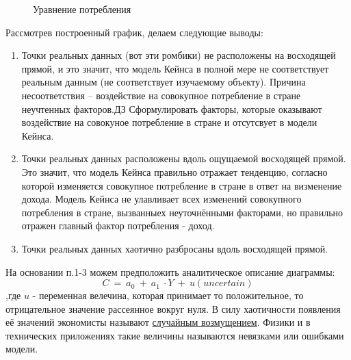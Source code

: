 \documentclass[12pt,a4paper]{article}
\begin{document}
\begin{figure}[H]
\begin{center}
\end{center}
\caption{Уравнение потребления}
\end{figure}

Рассмотрев построенный график, делаем следующие выводы:
\begin{enumerate}
\item Точки реальных данных (вот эти ромбики) не расположены на восходящей прямой, и это значит, что модель Кейнса в полной мере не соответствует реальным данным (не соответствует изучаемому объекту). Причина несоответствия -- воздействие на совокупное потребление в стране неучтенных факторов.$\displaystyle \boxed{\text{ДЗ}}$ Сформулировать факторы, которые оказывают воздействие на совокуное потребление в стране и отсутсвует в модели Кейнса. 
\item Точки реальных данных расположены вдоль ощущаемой восходящей прямой. Это значит, что модель Кейнса правильно отражает тенденцию, согласно которой изменяется совокупное потребление в стране в ответ на визменение дохода. Модель Кейнса не улавливает всех изменений совокупного потребления в стране, вызванныех неуточнёнными факторами, но правильно отражен главный фактор потребления - доход.
\item Точки реальных данных хаотично разбросаны вдоль восходящей прямой.
\end{enumerate}

	На основании п.1-3 можем предположить аналитическое описание диаграммы:
\begin{equation}
C\ =\ a_{0} \ +\ a_{1} \ \cdot Y\ +\ u( uncertain)
\end{equation}
,где $\displaystyle u$ - переменная велечина, которая принимает то положительное, то отрицательное значение рассеянное вокруг нуля. В силу хаотичности появления её значений экономисты называют \underline{случайным возмущением}. Физики и в технических приложениях такие величины называются невязками или ошибками модели.
\end{document}
